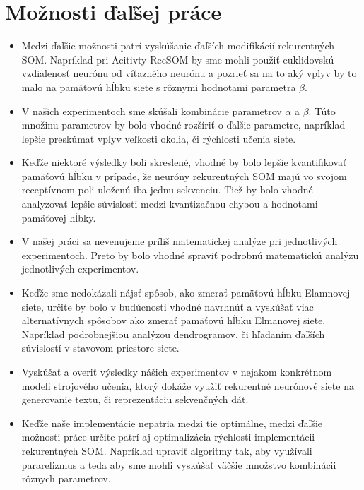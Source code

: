 \section{Možnosti ďaľšej práce}
\begin{itemize}
    \item Medzi ďaľšie možnosti patrí vyskúšanie ďaľších modifikácií rekurentných SOM. 
    Napríklad pri Acitivty RecSOM by sme mohli použiť euklidovskú vzdialenosť neurónu od víťazného neurónu a pozrieť sa na to aký vplyv by to malo 
    na pamäťovú hĺbku siete s rôznymi hodnotami parametra $\beta$.
    \item V našich experimentoch sme skúšali kombinácie parametrov $\alpha$ a $\beta$. Túto množinu parametrov by bolo vhodné rozšíriť o ďalšie parametre, napríklad
    lepšie preskúmať vplyv veľkosti okolia, či rýchlosti učenia siete.
    \item Keďže niektoré výsledky boli skreslené, vhodné by bolo lepšie kvantifikovať pamäťovú hĺbku v prípade, že neuróny rekurentných SOM majú vo svojom
    receptívnom poli uloženú iba jednu sekvenciu. 
    Tiež by bolo vhodné analyzovať lepšie súvislosti medzi kvantizačnou chybou a hodnotami pamäťovej hĺbky.
    \item V našej práci sa nevenujeme príliš matematickej analýze pri jednotlivých experimentoch.
    Preto by bolo vhodné spraviť podrobnú matematickú analýzu jednotlivých experimentov.
    \item Keďže sme nedokázali nájsť spôsob, ako zmerať pamäťovú hĺbku Elamnovej siete, určite by bolo 
    v budúcnosti vhodné navrhnúť a vyskúšať viac alternatívnych spôsobov ako zmerať pamäťovú hĺbku Elmanovej siete. 
    Napríklad podrobnejšiou analýzou dendrogramov, či hľadaním ďaľších súvislostí v stavovom priestore siete.
    \item Vyskúšať a overiť výsledky nášich experimentov v nejakom konkrétnom modeli strojového učenia, ktorý dokáže 
    využiť rekurentné neurónové siete na generovanie textu, či reprezentáciu sekvenčných dát.
    \item Keďže naše implementácie nepatria medzi tie optimálne, medzi ďaľšie možnosti práce
    určite patrí aj optimalizácia rýchlosti implementácii rekurentných SOM. Napríklad upraviť algoritmy tak, aby využívali
    pararelizmus a teda aby sme mohli vyskúšať väčšie množstvo kombinácii rôznych parametrov.
\end{itemize}





